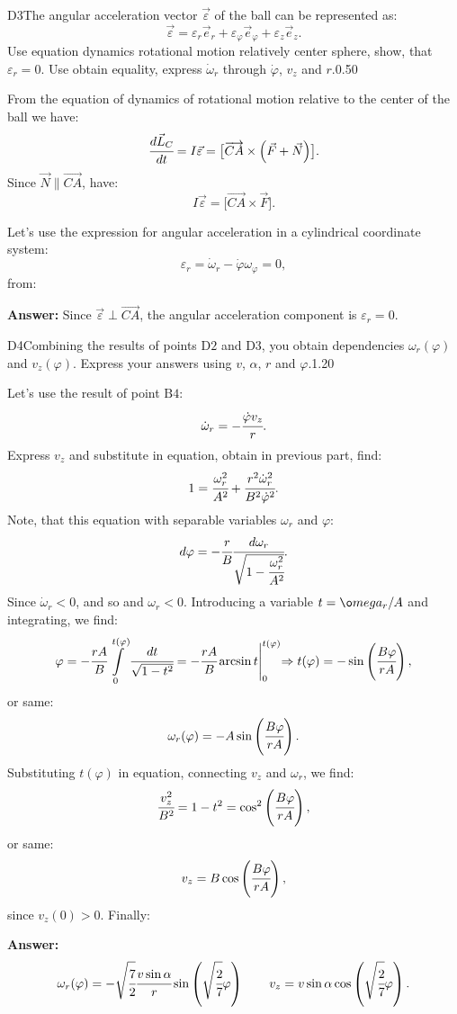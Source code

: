 \documentclass[11pt,a4paper]{article}
\begin{document}
\begin{solcard}{D3}{The angular acceleration vector $\vec{\varepsilon}$ of the ball can be represented as: $$\vec{\varepsilon}=\varepsilon_r\vec{e}_r+\varepsilon_\varphi\vec{e}_\varphi+\varepsilon_z\vec{e}_z{.} $$Use equation dynamics rotational motion relatively center sphere, show, that $\varepsilon_r=0$. Use obtain equality, express $\dot{\omega}_r$ through $\dot{\varphi}$, $v_z$ and $r$.}{0.50}

From the equation of dynamics of rotational motion relative to the center of the ball we have: $$\cfrac{d\vec{L}_C}{dt}=I\vec{\varepsilon}=\bigl[\overrightarrow{CA}\times\left(\vec{F}+\vec{N}\right)\bigr]{.} $$Since $\vec{N}\parallel\overrightarrow{CA}$, have: $$I\vec{\varepsilon}=\bigl[\overrightarrow{CA}\times\vec{F}\bigr]{.} $$


Let's use the expression for angular acceleration in a cylindrical coordinate system: $$\varepsilon_r=\dot{\omega}_r-\dot{\varphi}\omega_\varphi=0{,} $$from:

\par\smallskip\noindent\textbf{Answer:} Since $\vec{\varepsilon}\perp\overrightarrow{CA}$, the angular acceleration component is $\varepsilon_r=0$.
\end{solcard}

\begin{solcard}{D4}{Combining the results of points $\mathrm{D2}$ and $\mathrm{D3}$, you obtain dependencies $\omega_r(\varphi)$ and $v_z(\varphi)$. Express your answers using $v$, $\alpha$, $r$ and $\varphi$.}{1.20}

Let's use the result of point $\mathrm{B4}$: $$\dot{\omega}_r=-\cfrac{\dot{\varphi}v_z}{r}{.} $$Express $v_z$ and substitute in equation, obtain in previous part, find: $$1=\cfrac{\omega^2_r}{A^2}+\cfrac{r^2\dot{\omega}^2_r}{B^2\dot{\varphi}^2}{.} $$Note, that this equation with separable variables $\omega_r$ and $\varphi$: $$d\varphi=-\cfrac{r}{B}\cfrac{d\omega_r}{\sqrt{1-\cfrac{\omega^2_r}{A^2}}}{.}$$ Since $\dot{\omega}_r < 0$, and so and $\omega_r{<}0$. Introducing a variable $t=\o mega_r/A$ and integrating, we find: $$\varphi=-\cfrac{rA}{B}\int\limits_{0}^{t(\varphi)}\cfrac{dt}{\sqrt{1-t^2}}=-\cfrac{rA}{B}\arcsin t\Biggl|_{0}^{t(\varphi)}\Rightarrow t(\varphi)=-\sin\left(\cfrac{B\varphi}{rA}\right){,} $$or same: $$\omega_r(\varphi)=-A\sin\left(\cfrac{B\varphi}{rA}\right){.} $$Substituting $t(\varphi)$ in equation, connecting $v_ z$ and $\omega_r$, we find: $$\cfrac{v^2_z}{B^2}=1-t^2=\cos^2\left(\cfrac{B\varphi}{rA}\right){,} $$or same: $$v_z=B\cos\left(\cfrac{B\varphi}{rA}\right){,} $$since $v_z(0){>}0$. Finally:

\par\smallskip\noindent\textbf{Answer:} $$\omega_r(\varphi)=-\sqrt{\cfrac{7}{2}}\cfrac{v\sin\alpha}{r}\sin\left(\sqrt{\cfrac{2}{7}}\varphi\right)\qquad v_z=v\sin\alpha\cos\left(\sqrt{\cfrac{2}{7}}\varphi\right){.} $$
\end{solcard}
\end{document}
